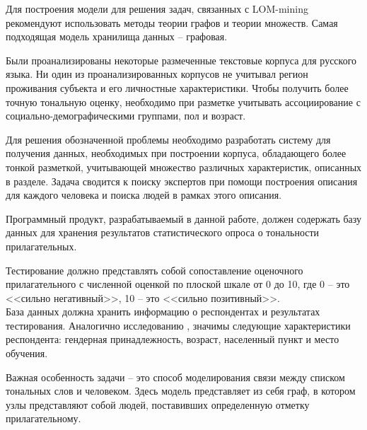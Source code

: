 Для построения модели для решения задач, связанных с LOM-mining рекомендуют использовать методы теории графов и теории множеств. Самая подходящая модель хранилища данных -- графовая. \cite{Попов2004} 

Были проанализированы некоторые размеченные текстовые корпуса для русского языка. Ни один из проанализированных корпусов не учитывал регион проживания субъекта и его личностные характеристики. Чтобы получить более точную тональную оценку, необходимо при разметке учитывать ассоциирование с социально-демографическими группами, пол и возраст.

Для решения обозначенной проблемы необходимо разработать систему для получения данных, необходимых при построении корпуса, обладающего более тонкой разметкой, учитывающей множество различных характеристик, описанных в разделе. Задача сводится к поиску экспертов при помощи построения описания для каждого человека и поиска людей в рамках этого описания. \cite{Petkova2006}

Программный продукт, разрабатываемый в данной работе, должен содержать базу данных для хранения результатов статистического опроса о тональности прилагательных. 

Тестирование должно представлять собой  сопоставление оценочного прилагательного с численной оценкой по плоской шкале от 0 до 10, где 0 -- это <<сильно негативный>>, 10 -- это <<сильно позитивный>>. \\
База данных должна хранить информацию о респондентах и результатах тестирования. Аналогично исследованию \cite{goodisgood}, значимы следующие характеристики респондента: гендерная принадлежность, возраст, населенный  пункт и место обучения. 

Важная особенность задачи -- это способ моделирования связи между списком тональных слов и человеком. Здесь модель представляет из себя граф, в котором узлы представляют собой людей, поставивших определенную отметку прилагательному. 